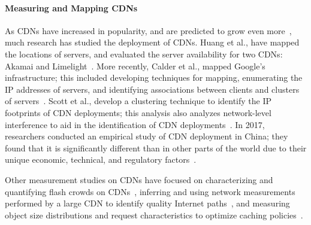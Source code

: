\paragraph{Measuring and Mapping CDNs} As CDNs have increased in popularity, and are predicted to grow even more~\cite{predict}, much research has 
studied the deployment of CDNs.  Huang et al., have mapped the locations of servers, and evaluated the server availability for two CDNs: 
Akamai and Limelight~\cite{huang2008measuring}.  More recently, Calder et al., mapped Google's infrastructure; this included 
developing techniques for mapping, enumerating the IP addresses of servers, and identifying associations between clients and clusters of 
servers~\cite{calder2013mapping}. Scott et al., develop a clustering technique to identify the IP footprints of CDN deployments; this analysis
 also analyzes network-level interference to aid in the identification of CDN deployments~\cite{scott2016satellite}.  In 2017, researchers 
conducted an empirical study of CDN deployment in China; they found that it is significantly different than in other parts of the world 
due to their unique economic, technical, and regulatory factors~\cite{xue2017cdns}. 

Other measurement studies on CDNs have focused on characterizing and quantifying flash crowds on CDNs~\cite{wendell2011going}, inferring 
and using network measurements performed by a large CDN to identify quality Internet paths~\cite{su2009drafting}, and measuring object size distributions and 
request characteristics to optimize caching policies~\cite{berger2017adaptsize}.
